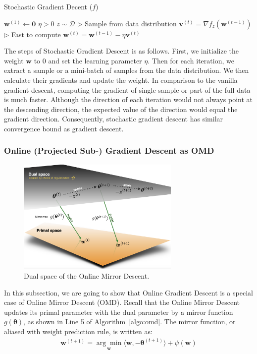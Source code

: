 \documentclass[11pt]{article}
\newcommand{\btheta}{\boldsymbol{\theta}}
\newcommand{\bw}{\boldsymbol{w}}
\newcommand{\bv}{\boldsymbol{v}}
\begin{document}
\begin{algorithm}[H]
\caption{Stochastic Gradient Decent ($f$)}
\label{algo:sgd}
\begin{algorithmic}[1]
\STATE $\bw^{(1)} \leftarrow \boldsymbol{0}$
\STATE $\eta > 0$
\STATE $z\sim\mathcal{D}$ \hfill $\triangleright$ Sample from data distribution
\STATE $\bv^{(t)} = \nabla f_z(\bw^{(t-1)})$ \hfill $\triangleright$ Fast to compute
\STATE $\bw^{(t)} = \bw^{(t-1)} - \eta\bv^{(t)}$
\ENDFOR
\end{algorithmic}
\end{algorithm}

The steps of Stochastic Gradient Descent is as follows. First, we initialize the weight $\bw$ to 0 and set the learning parameter $\eta$. Then for each iteration, we extract a sample or a mini-batch of samples from the data distribution. We then calculate their gradients and update the weight. In comparison to the vanilla gradient descent, computing the gradient of single sample or part of the full data is much faster. Although the direction of each iteration would not always point at the descending direction, the expected value of the direction would equal the gradient direction. Consequently, stochastic gradient descent has similar convergence bound as gradient descent.


\subsubsection{Online (Projected Sub-) Gradient Descent as OMD}


\begin{figure}[H]
    \centering
    \includegraphics[width=0.7\textwidth]{Img/dual_space.png}
    \caption{Dual space of the Online Mirror Descent.}
    \label{fig:dual_space}
\end{figure}

In this subsection, we are going to show that Online Gradient Descent is a special case of Online Mirror Descent (OMD). Recall that the Online Mirror Descent updates its primal parameter with the dual parameter by a mirror function $g(\btheta)$, as shown in Line 5 of Algorithm~\ref{algo:omd}. The mirror function, or aliased with weight prediction rule, is written as: 
\begin{equation*}
\begin{split}
\bw^{(t+1)} = \underset{\bw}{\arg\min} \langle \bw,-\btheta^{(t+1)} \rangle
+\psi(\bw)
\end{split}
\end{equation*}
\end{document}
